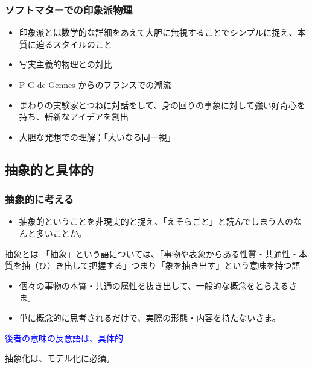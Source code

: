 \documentclass[12pt, dvipdfmx]{beamer}
\begin{document}
\begin{frame}
    \frametitle{ソフトマターでの印象派物理}
    \begin{itemize}
        \item 印象派とは数学的な詳細をあえて大胆に無視することでシンプルに捉え、本質に迫るスタイルのこと
        \item 写実主義的物理との対比
        \item P-G de Gennes からのフランスでの潮流
        \item まわりの実験家とつねに対話をして、身の回りの事象に対して強い好奇心を持ち、斬新なアイデアを創出
        \item 大胆な発想での理解；「大いなる同一視」
    \end{itemize}
\end{frame}

\subsection{抽象的と具体的}
\begin{frame}
    \frametitle{抽象的に考える}
        \begin{itemize}
            \item 抽象的ということを非現実的と捉え、「えそらごと」と読んでしまう人のなんと多いことか。
        \end{itemize}
    \begin{exampleblock}{抽象とは}
        「抽象」という語については、「事物や表象からある性質・共通性・本質を抽（ひ）き出して把握する」つまり「象を抽き出す」という意味を持つ語
        \begin{itemize}
            \item 個々の事物の本質・共通の属性を抜き出して、\alert{一般的な概念をとらえる}さま。
            \item 単に概念的に思考されるだけで、実際の形態・内容を持たないさま。
        \end{itemize}
        \textcolor{blue}{後者の意味の反意語は、具体的}
    \end{exampleblock}
    \large{\alert{抽象化は、モデル化に必須。}}
\end{frame}
\end{document}
